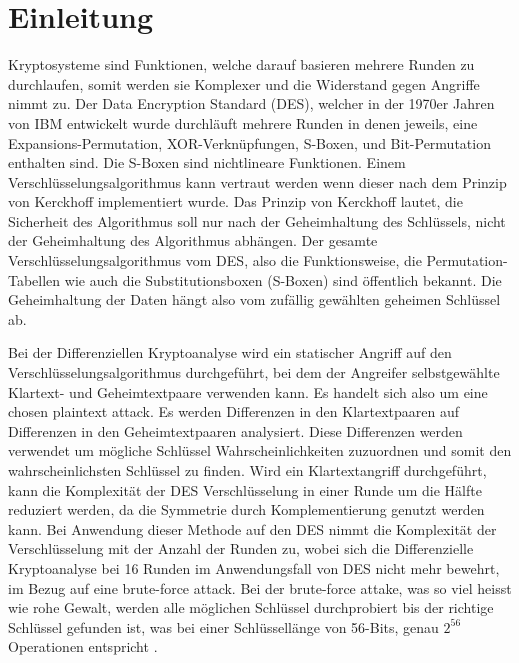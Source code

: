 \clearpage
\section{Einleitung}\label{sec:Einleitung}

Kryptosysteme sind Funktionen, welche darauf basieren mehrere Runden zu durchlaufen, somit werden sie Komplexer und die Widerstand gegen Angriffe nimmt zu. Der Data Encryption Standard (DES), welcher in der 1970er Jahren von IBM entwickelt wurde durchläuft mehrere Runden in denen jeweils, eine Expansions-Permutation,  XOR-Verknüpfungen, S-Boxen, und Bit-Permutation enthalten sind. Die S-Boxen sind nichtlineare Funktionen. Einem Verschlüsselungsalgorithmus kann vertraut werden wenn dieser nach dem Prinzip von Kerckhoff implementiert wurde. Das Prinzip von Kerckhoff lautet, die Sicherheit des Algorithmus soll nur nach der Geheimhaltung des Schlüssels, nicht der Geheimhaltung des Algorithmus abhängen. 
Der gesamte Verschlüsselungsalgorithmus vom DES, also die Funktionsweise, die Permutation-Tabellen wie auch die Substitutionsboxen (S-Boxen) sind öffentlich bekannt. 
Die Geheimhaltung der Daten hängt also vom zufällig gewählten geheimen Schlüssel ab. 

Bei der Differenziellen Kryptoanalyse wird ein statischer Angriff auf den Verschlüsselungsalgorithmus durchgeführt, bei dem der Angreifer selbstgewählte Klartext- und Geheimtextpaare verwenden kann. Es handelt sich also um eine chosen plaintext attack.  
Es werden Differenzen in den Klartextpaaren auf Differenzen in den Geheimtextpaaren analysiert. Diese Differenzen werden verwendet um mögliche Schlüssel Wahrscheinlichkeiten zuzuordnen und somit den wahrscheinlichsten Schlüssel zu finden. 
Wird ein Klartextangriff durchgeführt, kann die Komplexität der DES Verschlüsselung in einer Runde um die Hälfte reduziert werden, da die Symmetrie durch Komplementierung genutzt werden kann. Bei Anwendung dieser Methode auf den DES nimmt die Komplexität der Verschlüsselung mit der Anzahl der Runden zu, wobei sich die Differenzielle Kryptoanalyse bei 16 Runden im Anwendungsfall von DES nicht mehr bewehrt, im Bezug auf eine brute-force attack. Bei der brute-force attake, was so viel heisst wie rohe Gewalt, werden alle möglichen Schlüssel durchprobiert bis der richtige Schlüssel gefunden ist, was bei einer Schlüssellänge von 56-Bits, genau $2^{56}$ Operationen entspricht \cite{biham_differential_1990}. 
 
 



